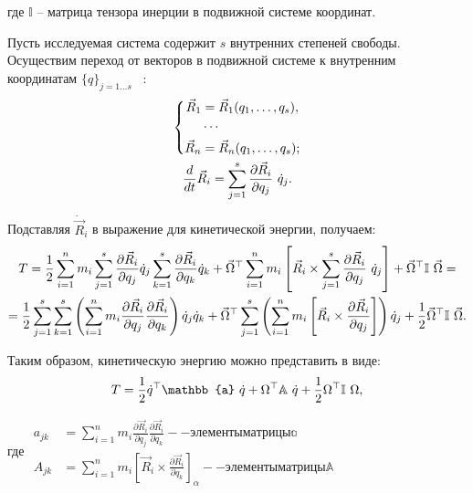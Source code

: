 \documentclass[12pt]{article}
\newcommand{\bbA}{\mathbb{A}}
\newcommand{\bba}{\mathbb{a}}
\newcommand{\bbI}{\mathbb{I}}
\newcommand{\vlevo}{\hspace*{-0.63cm}}
\newcommand{\vverh}{\vspace*{-0.1cm}}
\begin{document}
\vlevo где $\mathbb{I}$ -- матрица тензора инерции в подвижной системе координат.

Пусть исследуемая система содержит $s$ внутренних степеней свободы. Осуществим переход от векторов в подвижной системе к внутренним координатам $\big\{ q \big\}_{j=1 \dots s}$ \ :
\vverh
\begin{gather}
\left\{
\begin{aligned}
\vec{R}_1 &= \vec{R}_1 (q_1, \dots, q_s), \\
&\cdots \\
\vec{R}_n &= \vec{R}_n (q_1, \dots, q_s);
\end{aligned}
\right. \notag \\
\frac{d}{dt} \vec{R}_i = \sum_{j=1}^{s} \frac{\partial \vec{R}_i}{\partial q_j} \ \dot{q}_j \notag .
\end{gather}

Подставляя $\dot{\vec{R}}_i$ в выражение для кинетической энергии, получаем:
\vverh
\begin{gather}
T = \frac{1}{2} \sum_{i=1}^{n} m_i \sum_{j=1}^{s} \frac{\partial \vec{R}_i}{\partial q_j} \dot{q}_j \sum_{k=1}^{s} \frac{\partial \vec{R}_i}{\partial q_k} \dot{q}_k + \vec{\Omega}^\top \sum_{i=1}^{n} m_i \left[ \vec{R}_i \times \sum_{j=1}^{s} \frac{\partial \vec{R}_i}{\partial q_j} \ \dot{q}_j \right] + \vec{\Omega}^\top \bbI \ \vec{\Omega} = \notag \\
= \frac{1}{2} \sum_{j=1}^{s} \sum_{k=1}^{s} \left( \sum_{i=1}^{n} m_i \frac{\partial \vec{R}_i}{\partial q_j} \frac{\partial \vec{R}_i}{\partial q_k} \right) \dot{q}_j \dot{q}_k + \vec{\Omega}^\top \sum_{j=1}^{s} \left( \sum_{i=1}^{n} m_i \left[ \vec{R}_i \times \frac{\partial \vec{R}_i}{\partial q_j} \right] \right) \dot{q}_j + \frac{1}{2} \vec{\Omega}^\top \bbI \ \vec{\Omega} \notag .
\end{gather}

Таким образом, кинетическую энергию можно представить в виде:
\vverh
\begin{gather}
T = \frac{1}{2} \dot{q}^\top \mathbb{a} \ \dot{q} + \Omega^\top \mathbb{A} \ \dot{q} + \frac{1}{2} \Omega^\top \mathbb{I} \ \Omega \notag ,
\end{gather}

\vlevo где 
$
\begin{aligned}
a_{jk} &= \sum_{i=1}^{n} m_i \frac{\partial \vec{R}_i}{\partial q_j} \frac{\partial \vec{R}_i}{\partial q_k} -- элементы матрицы  \bba \\
A_{jk} &= \sum_{i=1}^{n} m_i \left[ \vec{R}_i \times \frac{\partial \vec{R}_i}{\partial q_k} \right]_{\alpha} -- элементы матрицы \bbA 
\end{aligned}
$
\end{document}
